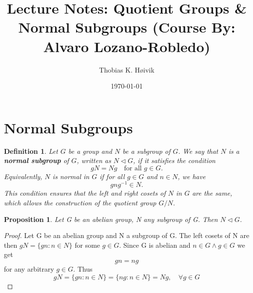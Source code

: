 \documentclass[12pt]{article}
\title{Lecture Notes: Quotient Groups \& Normal Subgroups (Course By: Alvaro Lozano-Robledo)}
\author{Thobias K. Høivik}
\date{\today}
\newtheorem{proposition}{Proposition}
\newtheorem{definition}{Definition}
\begin{document}
\maketitle
\section*{Normal Subgroups}
\begin{definition}
    Let \( G \) be a group and \( N \) be a subgroup of \( G \). 
    We say that \( N \) is a \textbf{normal subgroup} of \( G \), 
    written as \( N \triangleleft G \), if it satisfies the condition  
    \[
        gN = Ng \quad \text{for all } g \in G.
    \]
    Equivalently, \( N \) is normal in \( G \) if for all 
    \( g \in G \) and \( n \in N \), we have  
    \[
        gng^{-1} \in N.
    \]
    This condition ensures that the left and right cosets of \( N \) in \( G \)
    are the same, which allows the construction of the quotient group \( G/N \).
\end{definition}

\begin{proposition}    
    Let G be an abelian group, N any subgroup of G. Then \(N \triangleleft G\).
\end{proposition}
\begin{proof}
    Let G be an abelian group and N a subgroup of G. 
    The left cosets of N are then \(gN = \{gn : n\in N\}\) for some \(g \in G\). 
    Since G is abelian and \(n \in G \land g \in G\) we get
    \[
        gn = ng
    \]
    for any arbitrary \(g \in G\). Thus 
    \[ 
        gN = \{gn : n \in N\} = \{ng : n \in N\} = Ng, \quad \forall g \in G
    \]
\end{proof}


\break
\end{document}
